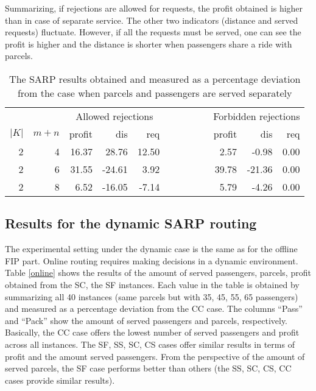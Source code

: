 \documentclass[preprint,authoryear,12pt]{elsarticle}
\begin{document}
Summarizing, if rejections are allowed for requests, the profit obtained is higher than in case of separate service. The other two indicators (distance and served requests) fluctuate. However, if all the requests must be served, one can see the profit is higher and the distance is shorter when passengers share a ride with parcels.

\begin{table} [!htbp]
\caption{The SARP results obtained and measured as a percentage deviation from the case when parcels and passengers are served separately}
\vspace{-1em}
\center
\small
\begin{tabular}{r r r r r r r r r}
\hline
& &\multicolumn{3}{c}{Allowed rejections} & &\multicolumn{3}{c}{Forbidden rejections}\\
$|K|$& $m+n$ & profit & dis & req &~~~~~~~& profit & dis & req\\
\hline
2 &  4 &  16.37 & 28.76 & 12.50 & &2.57 &-0.98 &0.00 \\
2 &  6 &  31.55 & -24.61 & 3.92 & &39.78 &-21.36 & 0.00\\
2 & 8 &  6.52 & -16.05 & -7.14 & & 5.79 & -4.26 & 0.00 \\
\hline
\end{tabular}
\label{seper combine}
\end{table}

\subsection{Results for the dynamic SARP routing}
\label{DSARP_results}
The experimental setting under the dynamic case is the same as for the offline FIP part. Online routing requires making decisions in a dynamic environment. Table \ref{online} shows the results of the amount of served passengers, parcels, profit obtained from the SC, the SF instances. Each value in the table is obtained by summarizing all 40 instances (same parcels but with 35, 45, 55, 65 passengers) and measured as a percentage deviation from the CC case. The columns ``Pass'' and ``Pack'' show the amount of served passengers and parcels, respectively. Basically, the CC case offers the lowest number of served passengers and profit across all instances.  The SF, SS, SC, CS cases offer similar results in terms of profit and the amount served passengers. From the perspective of the amount of served parcels, the SF case performs better than others (the SS, SC, CS, CC cases provide similar results). 
\end{document}
